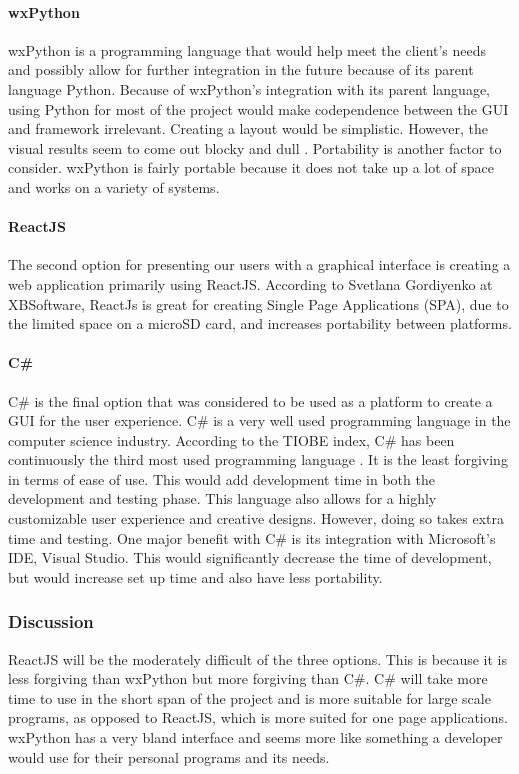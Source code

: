 \documentclass[draftclsnofoot, onecolumn, compsoc, 10pt]{IEEEtran}
\begin{document}
\paragraph{wxPython}
wxPython is a programming language that would help meet the client's needs and possibly allow for further integration in the future because of its parent language Python. Because of wxPython's integration with its parent language, using Python for most of the project would make codependence between the GUI and framework irrelevant. Creating a layout would be simplistic. However, the visual results seem to come out blocky and dull \cite{wxPython}. Portability is another factor to consider. wxPython is fairly portable because it does not take up a lot of space and works on a variety of systems. 
\paragraph{ReactJS}
The second option for presenting our users with a graphical interface is creating a web application primarily using ReactJS. According to Svetlana Gordiyenko at XBSoftware, ReactJs is great for creating Single Page Applications (SPA)\cite{React}, due to the limited space on a microSD card, and increases portability between platforms.
\paragraph{C\#}
C\# is the final option that was considered to be used as a platform to create a GUI for the user experience. C\# is a very well used programming language in the computer science industry. According to the TIOBE index,  C\# has been continuously the third most used programming language \cite{TIOBE}. It is the least forgiving in terms of ease of use. This would add development time in both the development and testing phase. This language also allows for a highly customizable user experience and creative designs. However, doing so takes extra time and testing. One major benefit with C\# is its integration with Microsoft's IDE, Visual Studio. This would significantly decrease the time of development, but would increase set up time and also have less portability.
\subsubsection{Discussion}
ReactJS will be the moderately difficult of the three options. This is because it is less forgiving than wxPython but more forgiving than C\#. C\# will take more time to use in the short span of the project and is more suitable for large scale programs, as opposed to ReactJS, which is more suited for one page applications. wxPython has a very bland interface and seems more like something a developer would use for their personal programs and its needs.
\end{document}
